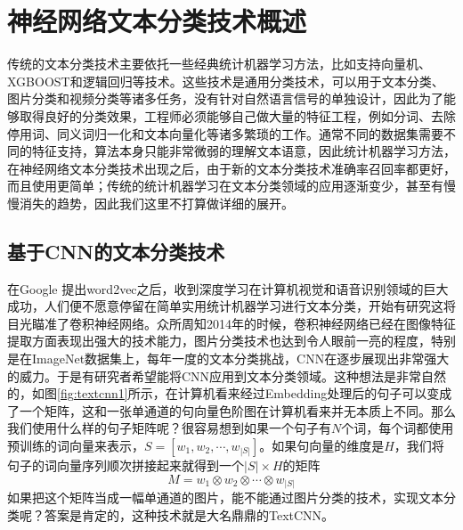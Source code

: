 \documentclass[twoside,a4paper,12pt]{book}%
\begin{document}
\section{神经网络文本分类技术概述}
传统的文本分类技术主要依托一些经典统计机器学习方法，比如支持向量机、XGBOOST和逻辑回归等技术。这些技术是通用分类技术，可以用于文本分类、图片分类和视频分类等诸多任务，没有针对自然语言信号的单独设计，因此为了能够取得良好的分类效果，工程师必须能够自己做大量的特征工程，例如分词、去除停用词、同义词归一化和文本向量化等诸多繁琐的工作。通常不同的数据集需要不同的特征支持，算法本身只能非常微弱的理解文本语意，因此统计机器学习方法，在神经网络文本分类技术出现之后，由于新的文本分类技术准确率召回率都更好，而且使用更简单；传统的统计机器学习在文本分类领域的应用逐渐变少，甚至有慢慢消失的趋势，因此我们这里不打算做详细的展开。
\subsection{基于CNN的文本分类技术}
在Google 提出word2vec之后，收到深度学习在计算机视觉和语音识别领域的巨大成功，人们便不愿意停留在简单实用统计机器学习进行文本分类，开始有研究这将目光瞄准了卷积神经网络。众所周知2014年的时候，卷积神经网络已经在图像特征提取方面表现出强大的技术能力，图片分类技术也达到令人眼前一亮的程度，特别是在ImageNet数据集上，每年一度的文本分类挑战，\gls{CNN}在逐步展现出非常强大的威力。于是有研究者希望能将\gls{CNN}应用到文本分类领域。这种想法是非常自然的，如图\ref{fig:textcnn1}所示，在计算机看来经过Embedding处理后的句子可以变成了一个矩阵，这和一张单通道的句向量色阶图在计算机看来并无本质上不同。那么我们使用什么样的句子矩阵呢？很容易想到如果一个句子有$N$个词，每个词都使用预训练的词向量来表示，$S=[w_1,w_2,\cdots,w_|S|]$。如果句向量的维度是$H$，我们将句子的词向量序列顺次拼接起来就得到一个$|S| \times H$的矩阵 
$$
M=w_1 \otimes w_2 \otimes \cdots \otimes w_{|S|}
$$
如果把这个矩阵当成一幅单通道的图片，能不能通过图片分类的技术，实现文本分类呢？答案是肯定的，这种技术就是大名鼎鼎的TextCNN。
\end{document}
